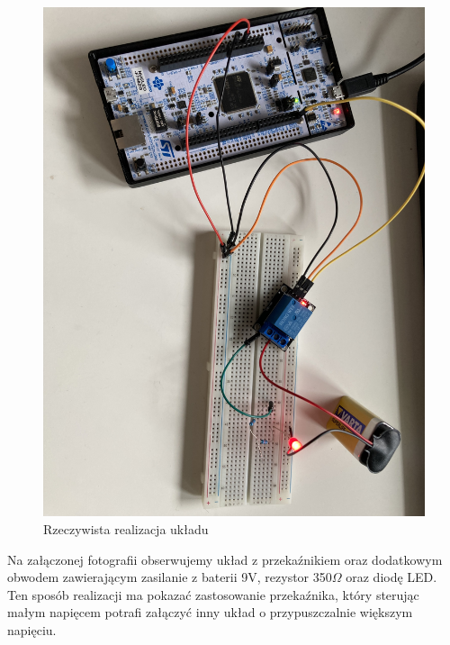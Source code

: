 \documentclass[11pt, a4paper]{article}
\begin{document}
\vspace{0.5cm}
\begin{figure}[h!]
    \centering
    \includegraphics[scale=0.1]{fig/obrazki/działanie_ukladu/CALOSC2.jpg}
    \caption{Rzeczywista realizacja układu}
    \label{fig:my_label}
\end{figure}
\vspace{0.5cm}

Na załączonej fotografii obserwujemy układ z przekaźnikiem oraz dodatkowym obwodem zawierającym zasilanie z baterii 9V, rezystor 350$\Omega$ oraz diodę LED. Ten sposób realizacji ma pokazać zastosowanie przekaźnika, który sterując małym napięcem potrafi załączyć inny układ o przypuszczalnie większym napięciu.

\newpage
\end{document}
